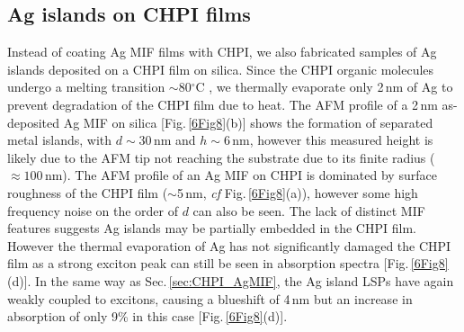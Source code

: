 \subsection{Ag islands on CHPI films}
\label{sec:AgonCHPI}

Instead of coating Ag MIF films with CHPI, we also fabricated samples of Ag islands deposited on a CHPI film on silica. Since the CHPI organic molecules undergo a melting transition $\sim$80$^{\circ}$C \cite{Barman2003}, we thermally evaporate only 2\,nm of Ag to prevent degradation of the CHPI film due to heat. The AFM profile of a 2\,nm as-deposited Ag MIF on silica [Fig.\,\ref{6Fig8}(b)] shows the formation of separated metal islands, with $d\sim30$\,nm and $h\sim6$\,nm, %
however this measured height is likely due to the AFM tip not reaching the substrate due to its finite radius ($\approx 100$\,nm). %
The AFM profile of an Ag MIF on CHPI is dominated by surface roughness of the CHPI film ($\sim$5\,nm, \textit{cf} Fig.\,\ref{6Fig8}(a)), however some high frequency noise on the order of $d$ can also be seen. The lack of distinct MIF features suggests Ag islands may be partially embedded in the CHPI film. However the thermal evaporation of Ag has not significantly damaged the CHPI film as a strong exciton peak can still be seen in absorption spectra [Fig.\,\ref{6Fig8}(d)]. In the same way as Sec.\,\ref{sec:CHPI_AgMIF}, the Ag island LSPs have again weakly coupled to excitons, causing a blueshift of 4\,nm but an increase in absorption of only 9\% in this case [Fig.\,\ref{6Fig8}(d)].
